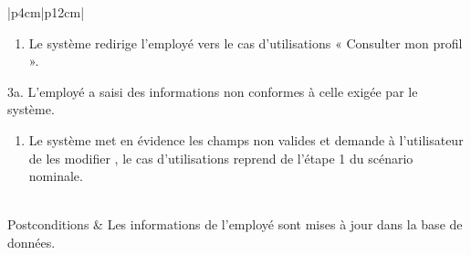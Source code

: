 \begin{longtable}{|p{4cm}|p{12cm}|}
\begin{minipage}[t]{\linewidth}
                        \begin{enumerate}[nosep,after=\strut]
                              \item Le système redirige l’employé vers le cas d’utilisations « Consulter mon profil ».
                        \end{enumerate}
                    \end{minipage}
                    \begin{minipage}[t]{\linewidth}
                    3a. L’employé a saisi des informations non conformes à celle exigée par le système.
                        \begin{enumerate}[nosep,after=\strut]
                              \item Le système met en évidence les champs non valides et demande à l’utilisateur de les modifier , le cas d’utilisations reprend de l’étape 1 du scénario nominale.
                        \end{enumerate}
                    \end{minipage}
                    \\
                    \hline
                    Postconditions &  Les informations de l’employé sont mises à jour dans la base de données. \\
                    \hline
                    \caption{Description du cas d'utilisation « Modifier mon profil »}\\
            \end{longtable}
            
